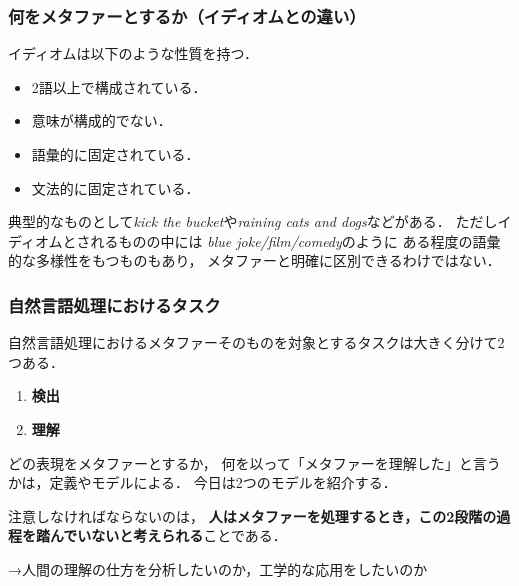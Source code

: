 \documentclass[11pt]{beamer}
\let\oldcitep=\citep
\renewcommand\citep[1]{\hyperlink{#1}{\oldcitep{#1}}}
\begin{document}
\begin{frame}
\frametitle{何をメタファーとするか（イディオムとの違い）}
イディオムは以下のような性質を持つ\citep{deignan}．
    \begin{itemize}

        \item 2語以上で構成されている．

        \item 意味が構成的でない．

        \item 語彙的に固定されている．

        \item 文法的に固定されている．

    \end{itemize}
典型的なものとして\emph{kick the bucket}や\emph{raining cats and dogs}などがある．
ただしイディオムとされるものの中には
\emph{blue joke/film/comedy}のように
ある程度の語彙的な多様性をもつものもあり，
メタファーと明確に区別できるわけではない．
\end{frame}

\begin{frame}
\frametitle{自然言語処理におけるタスク}
自然言語処理におけるメタファーそのものを対象とするタスクは大きく分けて2つある．
\begin{enumerate}
    \item \textbf{検出}

    \item \textbf{理解}

\end{enumerate}
どの表現をメタファーとするか，
何を以って「メタファーを理解した」と言うかは，定義やモデルによる．
今日は2つのモデルを紹介する．

\bigskip

注意しなければならないのは，
\textbf{人はメタファーを処理するとき，この2段階の過程を踏んでいないと考えられる}\citep{gibbs,giora2003}ことである．

→人間の理解の仕方を分析したいのか，工学的な応用をしたいのか
\end{frame}
\end{document}
